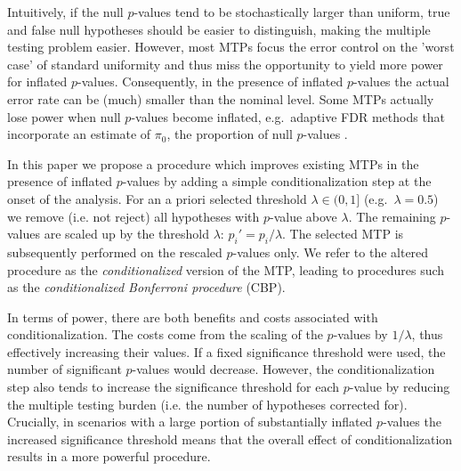 \documentclass {imsart}
\renewcommand{\emph}[1]{\textsl{#1}}
\begin{document}
Intuitively, if the null $p$-values tend to be stochastically larger than uniform, true and false null hypotheses should be easier to distinguish, making the multiple testing problem easier. However, most MTPs focus the error control on the 'worst case' of standard uniformity and thus miss the opportunity to yield more power for inflated $p$-values. Consequently, in the presence of inflated $p$-values the actual error rate can be (much) smaller than the nominal level. Some MTPs actually lose power when null $p$-values become inflated, e.g.\ adaptive FDR methods \citep[e.g.][]{Storey2002} that incorporate an estimate of $\pi_0$, the proportion of null $p$-values \citep[note 9 on p.\ 258]{Fischer2012}.

In this paper we propose a procedure which improves existing MTPs in the presence of inflated $p$-values by adding a simple conditionalization step at the onset of the analysis. For an a priori selected threshold $\lambda\in(0,1]$ (e.g.\ $\lambda=0.5$) we remove (i.e. not reject) all hypotheses with $p$-value above $\lambda$. The remaining $p$-values are scaled up by the threshold $\lambda$: $p_i'=p_i/\lambda $. The selected MTP is subsequently performed on the rescaled $p$-values only. We refer to the altered procedure as the \emph{conditionalized} version of the MTP, leading to procedures such as the \emph{conditionalized Bonferroni procedure} (CBP).

In terms of power, there are both benefits and costs associated with conditionalization. The costs come from the scaling of the $p$-values by $1/\lambda$, thus effectively increasing their values. If a fixed significance threshold were used, the number of significant $p$-values would decrease. However, the conditionalization step also tends to increase the significance threshold for each $p$-value by reducing the multiple testing burden (i.e. the number of hypotheses corrected for). Crucially, in scenarios with a large portion of substantially inflated $p$-values the increased significance threshold means that the overall effect of conditionalization results in a more powerful procedure.

\end{document}

